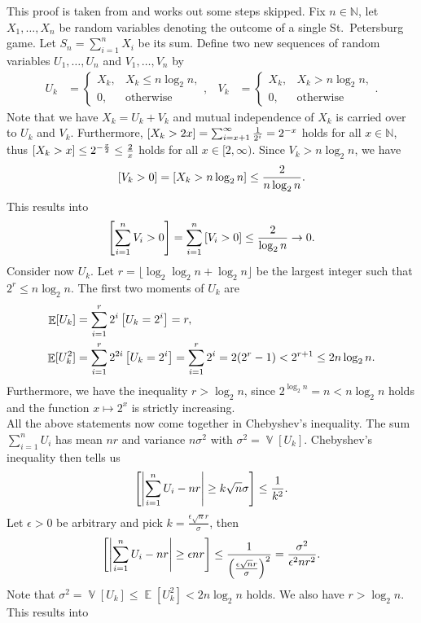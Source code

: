 \documentclass[twoside,a4paper]{article}
\theoremstyle{plain}
\theoremstyle{definition}
\theoremstyle{remark}
\numberwithin{equation}{section}
\newcommand{\N}{\mathbb{N}}
\let\P\relax
\DeclareMathOperator{\P}{\mathbb{P}}
\DeclareMathOperator{\V}{\mathbb{V}}
\DeclareMathOperator{\E}{\mathbb{E}}
\DeclareMathOperator{\1}{\mathbbm{1}}
\begin{document}
This proof is taken from \cite{Feller50} and works out some steps \cite{Feller50} skipped. Fix $n\in\N$, let $X_1,\ldots,X_n$ be random variables denoting the outcome of a single St.~Petersburg game. Let $S_n=\sum_{i=1}^nX_i$ be its sum. Define two new sequences of random variables $U_1,\ldots,U_n$ and $V_1,\ldots,V_n$ by
\begin{align*}
U_k&=\begin{cases}
X_k,&X_k\leq n\log_2 n,\\
0,&\text{otherwise}
\end{cases},&
V_k&=\begin{cases}
X_k,&X_k> n\log_2 n,\\
0,&\text{otherwise}
\end{cases}.
\end{align*}
Note that we have $X_k=U_k+V_k$ and mutual independence of $X_k$ is carried over to $U_k$ and $V_k$. Furthermore, $\P[X_k > 2x]=\sum_{i=x+1}^\infty\frac{1}{2^i}=2^{-x}$ holds for all $x\in\N$, thus $\P[X_k>x]\leq2^{-\frac{x}{2}}\leq\frac{2}{x}$ holds for all $x\in[2,\infty)$. Since $V_k>n\log_2 n$, we have \[\P[V_k>0]=\P[X_k>n\log_2 n]\leq\frac{2}{n\log_2 n}.\] This results into
\[\P\left[\sum_{i=1}^n V_i>0\right]=\sum_{i=1}^n\P\left[V_i>0\right]\leq\frac{2}{\log_2 n}\to0.\]
Consider now $U_k$. Let $r=\lfloor\log_2\log_2 n+\log_2 n\rfloor$ be the largest integer such that $2^r\leq n\log_2 n$. The first two moments of $U_k$ are
\begin{align*}
\E[U_k]&=\sum_{i=1}^{r} 2^i\P\left[U_k=2^i\right]=r,\\
\E[U_k^2]&=\sum_{i=1}^{r} 2^{2i}\P\left[U_k=2^i\right]=\sum_{i=1}^{r} 2^{i}=2(2^r-1)<2^{r+1}\leq 2n\log_2 n.
\end{align*}
Furthermore, we have the inequality $r>\log_2 n$, since $2^{\log_2 n}=n<n\log_2 n$ holds and the function $x\mapsto 2^x$ is strictly increasing.\\
All the above statements now come together in Chebyshev's inequality. The sum $\sum_{i=1}^n U_i$ has mean $nr$ and variance $n\sigma^2$ with $\sigma^2=\V[U_k]$. Chebyshev's inequality then tells us
\[\P\left[\left|\sum_{i=1}^n U_i-nr\right|\geq k\sqrt{n}\sigma\right]\leq\frac{1}{k^2}.\]
Let $\epsilon>0$ be arbitrary and pick $k=\frac{\epsilon\sqrt{n}r}{\sigma}$, then
\[\P\left[\left|\sum_{i=1}^n U_i-nr\right|\geq \epsilon nr\right]\leq\frac{1}{\left(\frac{\epsilon \sqrt{n}r}{\sigma}\right)^2}=\frac{\sigma^2}{\epsilon^2 n r^2}.\]
Note that $\sigma^2=\V[U_k]\leq\E[U_k^2]<2n\log_2 n$ holds. We also have $r>\log_2 n$. This results into
\end{document}
